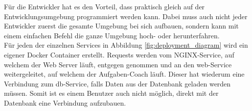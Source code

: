 Für die Entwickler hat es den Vorteil, dass praktisch gleich auf der Entwicklungsumgebung programmiert werden kann. Dabei muss auch nicht jeder Entwickler zuerst die gesamte Umgebung bei sich aufbauen, sondern kann mit einem einfachen Befehl die ganze Umgebung hoch- oder herunterfahren. \\

Für jeden der einzelnen Services in Abbildung \ref{fig:deployment_diagram} wird ein eigener Docker Container erstellt. Requests werden vom NGINX-Service, auf welchem der Web Server läuft, entgegen genommen und an den web-Service weitergeleitet, auf welchem der Aufgaben-Coach läuft. Dieser hat wiederum eine Verbindung zum db-Service, falls Daten aus der Datenbank geladen werden müssen. Somit ist es einem Benutzer auch nicht möglich, direkt mit der Datenbank eine Verbindung aufzubauen. 